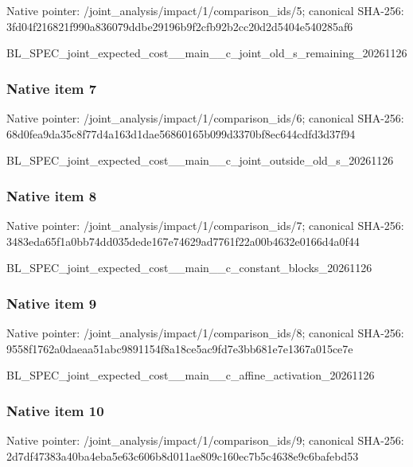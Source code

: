 \documentclass[10pt,a4paper]{article}
\begin{document}
Native pointer: /joint\_analysis/impact/1\allowbreak{}/comparison\_ids/5; canonical SHA-256: 3fd04f216821f990a836079d\allowbreak{}dbe29196b9f2cfb92b2cc20d\allowbreak{}2d5404e540285af6


BL\_SPEC\_joint\_expected\_c\allowbreak{}ost\_\_main\_\_c\_joint\_old\_s\allowbreak{}\_remaining\_20261126


\subsubsection{Native item 7}


Native pointer: /joint\_analysis/impact/1\allowbreak{}/comparison\_ids/6; canonical SHA-256: 68d0fea9da35c8f77d4a163d\allowbreak{}1dae56860165b099d3370bf8\allowbreak{}ec644cdfd3d37f94


BL\_SPEC\_joint\_expected\_c\allowbreak{}ost\_\_main\_\_c\_joint\_outsi\allowbreak{}de\_old\_s\_20261126


\subsubsection{Native item 8}


Native pointer: /joint\_analysis/impact/1\allowbreak{}/comparison\_ids/7; canonical SHA-256: 3483eda65f1a0bb74dd035de\allowbreak{}de167e74629ad7761f22a00b\allowbreak{}4632e0166d4a0f44


BL\_SPEC\_joint\_expected\_c\allowbreak{}ost\_\_main\_\_c\_constant\_bl\allowbreak{}ocks\_20261126


\subsubsection{Native item 9}


Native pointer: /joint\_analysis/impact/1\allowbreak{}/comparison\_ids/8; canonical SHA-256: 9558f1762a0daeaa51abc989\allowbreak{}1154f8a18ce5ac9fd7e3bb68\allowbreak{}1e7e1367a015ce7e


BL\_SPEC\_joint\_expected\_c\allowbreak{}ost\_\_main\_\_c\_affine\_acti\allowbreak{}vation\_20261126


\subsubsection{Native item 10}


Native pointer: /joint\_analysis/impact/1\allowbreak{}/comparison\_ids/9; canonical SHA-256: 2d7df47383a40ba4eba5e63c\allowbreak{}606b8d011ae809c160ec7b5c\allowbreak{}4638e9c6bafebd53
\end{document}
